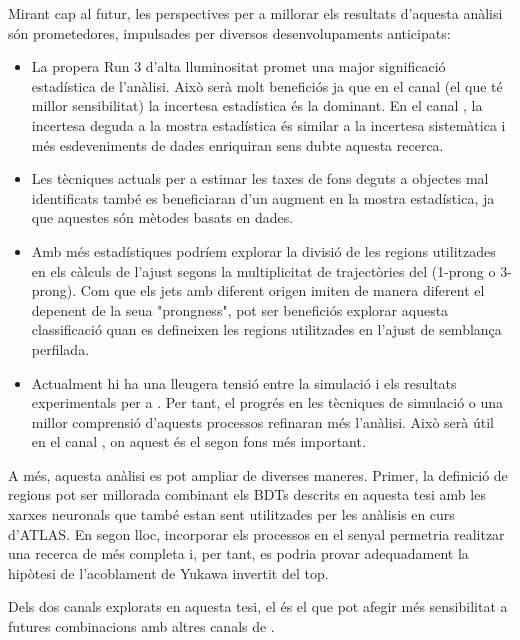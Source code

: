 Mirant cap al futur, les perspectives per a millorar els resultats d'aquesta anàlisi són prometedores, impulsades per diversos desenvolupaments anticipats:
\begin{itemize}
\item La propera Run 3 d'alta lluminositat promet una major significació estadística de l'anàlisi. Això serà molt beneficiós ja que en el canal \dilepSStau (el que té millor sensibilitat) la incertesa estadística és la dominant. En el canal \dilepOStau, la incertesa deguda a la mostra estadística és similar a la incertesa sistemàtica i més esdeveniments de dades enriquiran sens dubte aquesta recerca.
\item Les tècniques actuals per a estimar les taxes de fons deguts a objectes mal identificats també es beneficiaran d'un augment en la mostra estadística, ja que aquestes són mètodes basats en dades.

\item Amb més estadístiques podríem explorar la divisió de les regions utilitzades en els càlculs de l'ajust segons la multiplicitat de trajectòries del \tauhad (1-prong o 3-prong). Com que els jets amb diferent origen imiten de manera diferent el \tauhad depenent de la seua "prongness", pot ser beneficiós explorar aquesta classificació quan es defineixen les regions utilitzades en l'ajust de semblança perfilada.

\item Actualment hi ha una lleugera tensió entre la simulació i els resultats experimentals per a \ttW. Per tant, el progrés en les tècniques de simulació o una millor comprensió d'aquests processos refinaran més l'anàlisi. Això serà útil en el canal \dilepSStau, on aquest és el segon fons més important.


\end{itemize}

A més, aquesta anàlisi es pot ampliar de diverses maneres. Primer, la definició de regions pot ser millorada combinant els BDTs descrits en aquesta tesi amb les xarxes neuronals que també estan sent utilitzades per les anàlisis en curs d'ATLAS. En segon lloc, incorporar els processos \tWH en el senyal permetria realitzar una recerca de \tH més completa i, per tant, es podria provar adequadament la hipòtesi de l'acoblament de Yukawa invertit del top.

Dels dos canals explorats en aquesta tesi, el \dilepSStau és el que pot afegir més sensibilitat a futures combinacions amb altres canals de \tHq.





